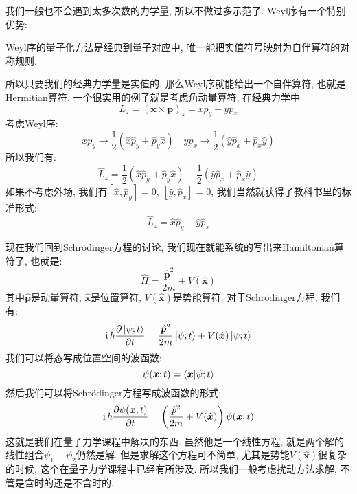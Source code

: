我们一般也不会遇到太多次数的力学量, 所以不做过多示范了.
Weyl序有一个特别优势:
\begin{theorem}[][Weyl序的优势]
  Weyl序的量子化方法是经典到量子对应中, 唯一能把实值符号映射为自伴算符的对称规则.
\end{theorem}
所以只要我们的经典力学量是实值的, 那么Weyl序就能给出一个自伴算符, 也就是Hermitian算符.
一个很实用的例子就是考虑角动量算符, 在经典力学中
\begin{equation}
  L_z = (\bm{x} \times \bm{p} )_z = x p_y - y p_x
\end{equation}
考虑Weyl序:
\begin{equation}
  x p_y \to \frac{1}{2} (\hat{x} \hat{p}_y + \hat{p}_y \hat{x}) \quad y p_x \to \frac{1}{2} (\hat{y} \hat{p}_x + \hat{p}_x \hat{y})
\end{equation}
所以我们有:
\begin{equation}
  \hat{L}_z = \frac{1}{2} (\hat{x} \hat{p}_y + \hat{p}_y \hat{x}) - \frac{1}{2} (\hat{y} \hat{p}_x + \hat{p}_x \hat{y})
\end{equation}
如果不考虑外场, 我们有$[\hat{x}, \hat{p}_y] = 0$,  $[\hat{y}, \hat{p}_x] = 0$, 我们当然就获得了教科书里的标准形式:
\begin{equation}
  \hat{L}_z = \hat{x} \hat{p}_y - \hat{y} \hat{p}_x
\end{equation}


现在我们回到Schrödinger方程的讨论, 我们现在就能系统的写出来Hamiltonian算符了, 也就是:
\begin{equation}
  \hat{H} = \frac{\hat{\bm{p}}^2}{2m} + V(\hat{\bm{x}})
\end{equation}
其中$\hat{\bm{p}}$是动量算符, $\hat{\bm{x}}$是位置算符, $V(\hat{\bm{x}})$是势能算符.
对于Schrödinger方程, 我们有:
\begin{equation}
  \mathrm{i}\, \hbar \pdv{\ket{\psi;t}}{t} = \frac{\hat{\bm{p}}^2}{2m} \ket{\psi;t} + V(\hat{\bm{x}}) \ket{\psi;t}
\end{equation}
我们可以将态写成位置空间的波函数:
\begin{equation}
  \psi(\bm{x}; t) = \braket{\bm{x}}{\psi;t}
\end{equation}
然后我们可以将Schrödinger方程写成波函数的形式:
\begin{equation}
  \mathrm{i}\, \hbar \pdv{\psi(\bm{x}; t)}{t} = \left(\frac{\hat{p}^2}{2m} + V(\hat{\bm{x}}) \right) \psi(\bm{x}; t)
\end{equation}
这就是我们在量子力学课程中解决的东西.
虽然他是一个线性方程, 就是两个解的线性组合$\psi_1 + \psi_2$仍然是解.
但是求解这个方程可不简单, 尤其是势能$V(\hat{\bm{x}})$很复杂的时候, 这个在量子力学课程中已经有所涉及.
所以我们一般考虑扰动方法求解, 不管是含时的还是不含时的.

